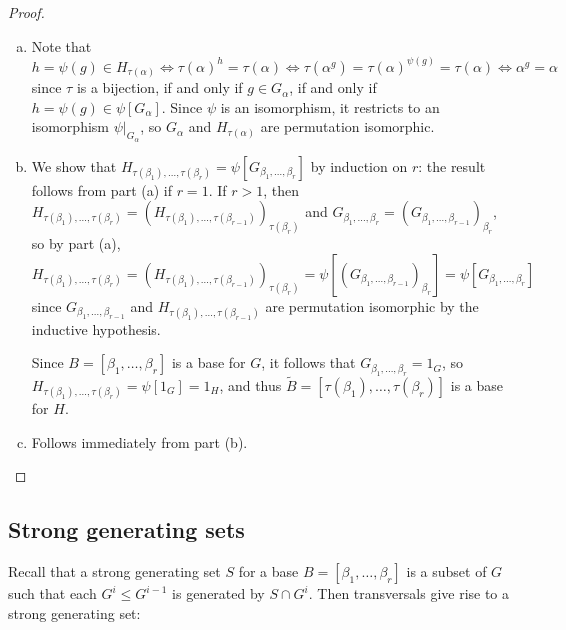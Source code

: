 {    \begin{proof}
        \begin{enumerate}[(a)]
            \item Note that
                  $$h = \psi(g) \in H_{\tau(\alpha)} \iff \tau(\alpha)^h = \tau(\alpha) \iff \tau(\alpha^g) = \tau(\alpha)^{\psi(g)} = \tau(\alpha) \iff \alpha^g = \alpha$$
                  since $\tau$ is a bijection, if and only if $g \in G_\alpha$, if and only if $h = \psi(g) \in \psi[G_\alpha].$ Since $\psi$ is an isomorphism, it restricts to an isomorphism $\psi|_{G_\alpha}$, so $G_\alpha$ and $H_{\tau(\alpha)}$ are permutation isomorphic.
            \item We show that $H_{\tau(\beta_1),\dotsc,\tau(\beta_r)} = \psi[G_{\beta_1,\dotsc,\beta_r}]$ by induction on $r$: the result follows from part (a) if $r = 1$. If $r > 1$, then $H_{\tau(\beta_1),\dotsc,\tau(\beta_r)} = (H_{\tau(\beta_1),\dotsc,\tau(\beta_{r-1})})_{\tau(\beta_r)}$ and $G_{\beta_1,\dotsc,\beta_r} = (G_{\beta_1,\dotsc,\beta_{r-1}})_{\beta_r}$, so by part (a),
                  $$H_{\tau(\beta_1),\dotsc,\tau(\beta_r)} = (H_{\tau(\beta_1),\dotsc,\tau(\beta_{r-1})})_{\tau(\beta_r)} = \psi[(G_{\beta_1,\dotsc,\beta_{r-1}})_{\beta_r}] = \psi[G_{\beta_1,\dotsc,\beta_r}]$$
                  since $G_{\beta_1,\dotsc,\beta_{r-1}}$ and $H_{\tau(\beta_1),\dotsc,\tau(\beta_{r-1})}$ are permutation isomorphic by the inductive hypothesis.

                  Since $B = [\beta_1,\dotsc,\beta_r]$ is a base for $G$, it follows that $G_{\beta_1,\dotsc,\beta_r} = 1_G$, so $H_{\tau(\beta_1),\dotsc,\tau(\beta_r)} = \psi[1_G] = 1_H$, and thus $\tilde B = [\tau(\beta_1),\dotsc,\tau(\beta_r)]$ is a base for $H$.
            \item Follows immediately from part (b).
        \end{enumerate}
    \end{proof}}

\subsection{Strong generating sets}

Recall that a strong generating set $S$ for a base $B = [\beta_1,\dotsc,\beta_r]$ is a subset of $G$ such that each $G^i \leq G^{i-1}$ is generated by $S \cap G^i$.  Then transversals  give rise to a strong generating set:

